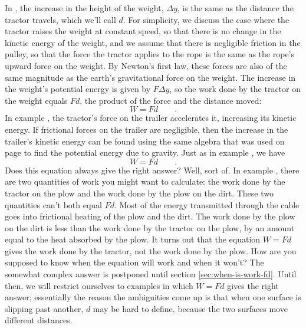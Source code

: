 In , the increase in the height of the weight,
$\Delta y$, is the same as the distance the tractor travels,
which we'll call $d$. For simplicity, we discuss the case where the
tractor raises the weight at constant speed, so that there
is no change in the kinetic energy of the weight, and we
assume that there is negligible friction in the pulley, so
that the force the tractor applies to the rope is the same
as the rope's upward force on the weight. By Newton's first
law, these forces are also of the same magnitude as the
earth's gravitational force on the weight. The increase in
the weight's potential energy is given by $F\Delta y$, so
the work done by the tractor on the weight equals $Fd$,
the product of the force and the distance moved:
\begin{equation*}
                W  =  Fd   \qquad   .
\end{equation*}
In example , the tractor's force on the trailer
accelerates it, increasing its kinetic energy. If frictional
forces on the trailer are negligible, then the increase in
the trailer's kinetic energy can be found using the same
algebra that was used on page \pageref{pe-derivation} to find the
potential energy due to gravity. Just as in example , we have
\begin{equation*}
                W  =  Fd   \qquad   .
\end{equation*}
Does this equation always give the right answer? Well, sort
of. In example , there are two quantities of work you
might want to calculate: the work done by the tractor on the
plow and the work done by the plow on the dirt.\label{plow-discussion} These two
quantities can't both equal $Fd$. Most of the energy transmitted
through the cable goes into frictional heating of the plow and
the dirt. The work done by the plow on the dirt is less than
the work done by the tractor on the plow, by an amount equal to
the heat absorbed by the plow. It turns out that the equation
$W=Fd$ gives the work done by the tractor, not the
work done by the plow. How are you supposed to know when the
equation will work and when it won't? The somewhat complex
answer is postponed until section \ref{sec:when-is-work-fd}. Until then, we will
restrict ourselves to examples in which $W=Fd$
gives the right answer; essentially the reason the ambiguities come
up is that when one surface is slipping past another, $d$ may be
hard to define, because the two surfaces move different distances.

